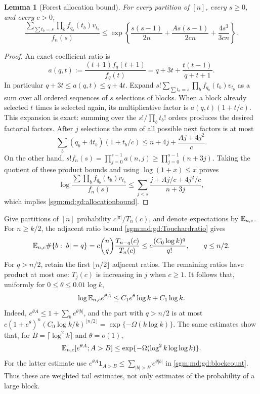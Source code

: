 \documentclass[11pt,letterpaper]{article}
\newtheorem{lemma}[theorem]{Lemma}\newtheorem{proposition}[theorem]{Proposition}\newtheorem{corollary}[theorem]{Corollary}
\theoremstyle{remark}\newtheorem{remark}[theorem]{Remark}
\theoremstyle{definition}\newtheorem{definition}[theorem]{Definition}
\begin{document}
\begin{lemma}[Forest allocation bound]\label{sgm:md:gd:allocation}
For every partition of $[n]$, every $s\ge0$, and every $c>0$,
\begin{equation}\label{sgm:md:gd:allocationbound}
 \frac{\displaystyle\sum_{\sum t_b=s}\prod_b f_{q_b}(t_b)v_{t_b}}
      {f_n(s)}
 \le
 \exp\!\left\{
 \frac{s(s-1)}{2n}
 +\frac{A s(s-1)}{2cn}
 +\frac{4s^3}{3cn}\right\}.
\end{equation}
\end{lemma}
\begin{proof}
An exact coefficient ratio is
\begin{equation}\label{sgm:md:gd:aratio}
 a(q,t):=\frac{(t+1)f_q(t+1)}{f_q(t)}
 =q+3t+\frac{t(t-1)}{q+t+1}.
\end{equation}
In particular $q+3t\le a(q,t)\le q+4t$.
Expand $s!\sum_{\sum t_b=s}\prod_bf_{q_b}(t_b)v_{t_b}$ as a sum over
all ordered sequences of $s$ selections of blocks.  When a block already
selected $t$ times is selected again, its multiplicative factor is
$a(q,t)(1+t/c)$.  This expansion is exact: summing over the
$s!/\prod_b t_b!$ orders produces the desired factorial factors.
After $j$ selections the sum of all possible next factors is at most
\[
 \sum_b(q_b+4t_b)(1+t_b/c)
 \le n+4j+\frac{Aj+4j^2}{c}.
\]
On the other hand,
$s!f_n(s)=\prod_{j=0}^{s-1}a(n,j)\ge\prod_{j=0}^{s-1}(n+3j)$.
Taking the quotient of these product bounds and using
$\log(1+x)\le x$ proves
\[
 \log\frac{\sum\prod_b f_{q_b}(t_b)v_{t_b}}{f_n(s)}
 \le\sum_{j<s}\frac{j+Aj/c+4j^2/c}{n+3j},
\]
which implies \eqref{sgm:md:gd:allocationbound}.
\end{proof}

Give partitions of $[n]$ probability $c^{|\pi|}/T_n(c)$, and denote
expectations by $\mathbb E_{n,c}$.  For $n\ge k/2$, the adjacent ratio bound
\eqref{sgm:md:gd:Touchardratio} gives
\begin{equation}\label{sgm:md:gd:blockcount}
 \mathbb E_{n,c}\#\{b:|b|=q\}
 =c\binom nq\frac{T_{n-q}(c)}{T_n(c)}
 \le c\frac{(C_0\log k)^q}{q!},\qquad q\le n/2.
\end{equation}
For $q>n/2$, retain the first $\lfloor n/2\rfloor$ adjacent ratios.
The remaining ratios have product at most one: $T_j(c)$ is increasing
in $j$ when $c\ge1$.  It follows that, uniformly for
$0\le\theta\le0.01\log k$,
\begin{equation}\label{sgm:md:gd:blockmgf}
 \log\mathbb E_{n,c}e^{\theta A}
 \le C_1e^\theta\log k+C_1\log k.
\end{equation}
Indeed, $e^{\theta A}\le1+\sum_b e^{\theta|b|}$, and the part with
$q>n/2$ is at most
$c(1+e^\theta)^n(C_0\log k/k)^{\lfloor n/2\rfloor}
 =\exp\{-\Omega(k\log k)\}$.
The same estimates show that, for $B=\lceil\log^2k\rceil$ and
$\theta=o(1)$,
\begin{equation}\label{sgm:md:gd:blocktail}
 \mathbb E_{n,c}[e^{\theta A};A>B]
 \le\exp\{-\Omega(\log^2k\log\log k)\}.
\end{equation}
For the latter estimate use
$e^{\theta A}\mathbf1_{A>B}\le\sum_{|b|>B}e^{\theta|b|}$ in
\eqref{sgm:md:gd:blockcount}.  Thus these are weighted tail estimates, not
only estimates of the probability of a large block.
\end{document}
